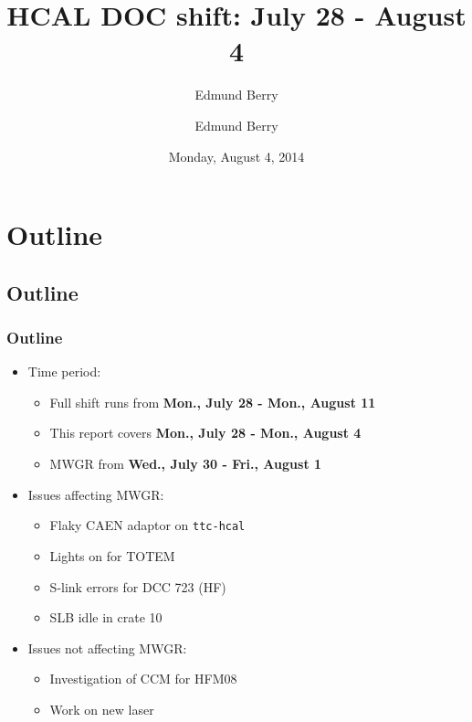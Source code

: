 \documentclass[bigger]{beamer}
\title{HCAL DOC shift: July 28 - August 4}
\author{Edmund Berry}
\date{Monday, August 4, 2014}
\author[Edmund Berry]{\alert{Edmund Berry}}
\providecommand{\alert}[1]{\textbf{#1}}
\begin{document}
\maketitle


\section{Outline}
\label{sec-1}
\subsection{Outline}
\label{sec-1-1}
\begin{frame}
\frametitle{Outline}
\label{sec-1-1-1}
\begin{itemize}

\item Time period:
\label{sec-1-1-1-1}%
\begin{itemize}

\item Full shift runs from \alert{Mon., July 28 - Mon., August 11}
\label{sec-1-1-1-1-1}%

\item This report covers \alert{Mon., July 28 - Mon., August 4}
\label{sec-1-1-1-1-2}%

\item MWGR from \alert{Wed., July 30 - Fri., August 1}
\label{sec-1-1-1-1-3}%
\end{itemize} %

\item Issues affecting MWGR:
\label{sec-1-1-1-2}%
\begin{itemize}

\item Flaky CAEN adaptor on \texttt{ttc-hcal}
\label{sec-1-1-1-2-1}%

\item Lights on for TOTEM
\label{sec-1-1-1-2-2}%

\item S-link errors for DCC 723 (HF)
\label{sec-1-1-1-2-3}%

\item SLB idle in crate 10
\label{sec-1-1-1-2-4}%
\end{itemize} %

\item Issues not affecting MWGR:
\label{sec-1-1-1-3}%
\begin{itemize}

\item Investigation of CCM for HFM08
\label{sec-1-1-1-3-1}%

\item Work on new laser
\label{sec-1-1-1-3-2}%
\end{itemize} %
\end{itemize} %
\end{frame}
\end{document}
